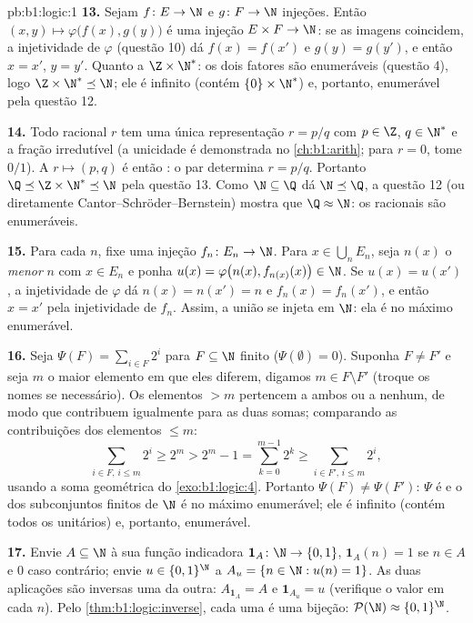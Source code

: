 \begin{solution}{pb:b1:logic:1}
\textbf{13.} Sejam $f \colon E \to \N$ e $g \colon F \to \N$
injeções. Então $(x, y) \mapsto \varphi\bigl(f(x), g(y)\bigr)$ é uma
injeção $E \times F \to \N$: se as imagens coincidem, a injetividade de
$\varphi$ (questão 10) dá $f(x) = f(x')$ e $g(y) = g(y')$,
e então $x = x'$, $y = y'$. Quanto a $\Z \times \N^*$: os dois fatores são
enumeráveis (questão 4), logo $\Z \times \N^* \preceq \N$; ele é
infinito (contém $\{0\} \times \N^*$) e, portanto, enumerável pela
questão 12.

\textbf{14.} Todo racional $r$ tem uma única representação $r =
p/q$ com $p \in \Z$, $q \in \N^*$ e a fração irredutível
(a unicidade é demonstrada no \cref{ch:b1:arith}; para $r = 0$, tome
$0/1$). A  $r \mapsto (p, q)$ é então : o par
determina $r = p/q$. Portanto $\Q \preceq \Z \times \N^* \preceq \N$
pela questão 13. Como $\N \subseteq \Q$ dá $\N \preceq \Q$,
a questão 12 (ou diretamente Cantor--Schröder--Bernstein) mostra que $\Q
\approx \N$: os racionais são enumeráveis.

\textbf{15.} Para cada $n$, fixe uma injeção $f_n \colon E_n \to \N$.
Para $x \in \bigcup_n E_n$, seja $n(x)$ o \emph{menor} $n$ com
$x \in E_n$ e ponha $u(x) = \varphi\bigl(n(x), f_{n(x)}(x)\bigr)
\in \N$. Se $u(x) = u(x')$, a injetividade de $\varphi$ dá $n(x) =
n(x') = n$ e $f_n(x) = f_n(x')$, e então $x = x'$ pela injetividade de
$f_n$. Assim, a união se injeta em $\N$: ela é no máximo enumerável.

\textbf{16.} Seja $\Psi(F) = \sum_{i \in F} 2^i$ para $F \subseteq \N$
finito ($\Psi(\emptyset) = 0$). Suponha $F \neq F'$ e seja $m$
o maior elemento em que eles diferem, digamos $m \in F \setminus
F'$ (troque
os nomes se necessário). Os elementos $> m$ pertencem a ambos ou a
nenhum, de modo que contribuem igualmente para as duas somas; comparando
as contribuições dos elementos $\leq m$:
\[
\sum_{i \in F,\, i \leq m} 2^i \geq 2^m
> 2^m - 1 = \sum_{k=0}^{m-1} 2^k
\geq \sum_{i \in F',\, i \leq m} 2^i ,
\]
usando a soma geométrica do \cref{exo:b1:logic:4}. Portanto $\Psi(F)
\neq \Psi(F')$: $\Psi$ é  e o  dos subconjuntos finitos
de $\N$ é no máximo enumerável; ele é infinito (contém todos os
 unitários) e, portanto, enumerável.

\textbf{17.} Envie $A \subseteq \N$ à sua função indicadora $\mathbf 1_A
\colon \N \to \{0,1\}$, $\mathbf 1_A(n) = 1$ se $n \in A$ e $0$
caso contrário; envie $u \in \{0,1\}^{\N}$ a $A_u = \{n \in \N : u(n) =
1\}$. As duas aplicações são inversas uma da outra: $A_{\mathbf 1_A} = A$ e
$\mathbf 1_{A_u} = u$ (verifique o valor em cada $n$). Pelo
\cref{thm:b1:logic:inverse}, cada uma é uma bijeção: $\mathcal{P}(\N)
\approx \{0,1\}^{\N}$.


\end{solution}
